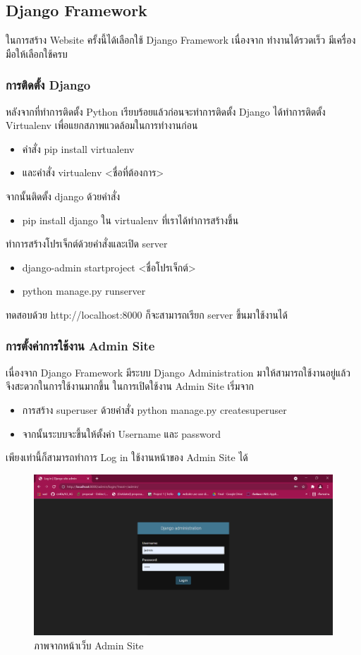 \subsection{Django Framework}
ในการสร้าง Website ครั้งนี้ได้เลือกใช้ Django Framework เนื่องจาก
ทำงานได้รวดเร็ว มีเครื่องมือให้เลือกใช้ครบ

\subsubsection{การติดตั้ง Django}
หลังจากที่ทำการติดตั้ง Python เรียบร้อยแล้วก่อนจะทำการติดตั้ง Django ได้ทำการติดตั้ง Virtualenv เพื่อแยกสภาพแวดล้อมในการทำงานก่อน 
\begin{itemize}
    \item คำสั่ง pip install virtualenv
    \item และคำสั่ง virtualenv <ชื่อที่ต้องการ>
\end{itemize}
จากนั้นติดตั้ง django ด้วยคำสั่ง 
\begin{itemize}
    \item pip install django ใน virtualenv ที่เราได้ทำการสร้างขึ้น
\end{itemize}
ทำการสร้างโปรเจ็กต์ด้วยคำสั่งและเปิด server 
\begin{itemize}
    \item django-admin startproject <ชื่อโปรเจ็กต์>
    \item python manage.py runserver
\end{itemize}
ทดสอบด้วย http://localhost:8000 ก็จะสามารถเรียก server ขึ้นมาใช้งานได้

\subsubsection{การตั้งค่าการใช้งาน Admin Site}
เนื่องจาก Django Framework มีระบบ Django Administration มาให้สามารถใช้งานอยู่แล้ว จึงสะดวกในการใช้งานมากขึ้น
ในการเปิดใช้งาน Admin Site เริ่มจาก
\begin{itemize}
    \item การสร้าง superuser ด้วยคำสั่ง python manage.py createsuperuser
    \item จากนั้นระบบจะขึ้นให้ตั้งค่า Username และ password
\end{itemize}
เพียงเท่านี้ก็สามารถทำการ Log in ใช้งานหน้าของ Admin Site ได้
\newpage

\begin{figure}[!thb]
	\captionsetup{justification=centering}
	\centering
	\includegraphics[width=5in]{latex/figures/admin.png}
	\caption{ภาพจากหน้าเว็บ Admin Site}
	\label{figure:admin}
\end{figure}

